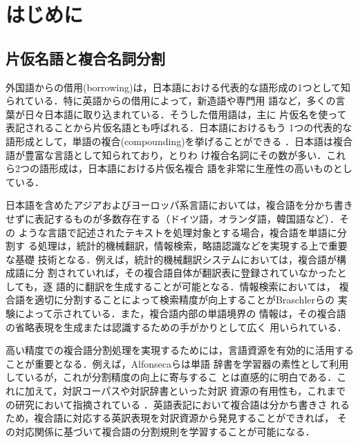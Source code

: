 \documentclass[japanese]{jnlp_1.4}
\begin{document}
\maketitle


\section{はじめに}

\subsection{片仮名語と複合名詞分割}

外国語からの借用(borrowing)は，日本語における代表的な語形成の1つとして知
られている\cite{Tsujimura06}．特に英語からの借用によって，新造語や専門用
語など，多くの言葉が日々日本語に取り込まれている．そうした借用語は，主に
片仮名を使って表記されることから片仮名語とも呼ばれる．日本語におけるもう
1つの代表的な語形成として，単語の複合(compounding)を挙げることができる
\cite{Tsujimura06}．日本語は複合語が豊富な言語として知られており，とりわ
け複合名詞にその数が多い．これら2つの語形成は，日本語における片仮名複合
語を非常に生産性の高いものとしている．

日本語を含めたアジアおよびヨーロッパ系言語においては，複合語を分かち書き
せずに表記するものが多数存在する（ドイツ語，オランダ語，韓国語など）．その
ような言語で記述されたテキストを処理対象とする場合，複合語を単語に分割す
る処理は，統計的機械翻訳，情報検索，略語認識などを実現する上で重要な基礎
技術となる．例えば，統計的機械翻訳システムにおいては，複合語が構成語に分
割されていれば，その複合語自体が翻訳表に登録されていなかったとしても，逐
語的に翻訳を生成することが可能となる\cite{Koehn03}．情報検索においては，
複合語を適切に分割することによって検索精度が向上することがBraschlerらの
実験によって示されている\cite{Braschler04}．また，複合語内部の単語境界の
情報は，その複合語の省略表現を生成または認識するための手がかりとして広く
用いられている\cite{Schwartz03,Okazaki08}．

高い精度での複合語分割処理を実現するためには，言語資源を有効的に活用する
ことが重要となる．例えば，Alfonsecaら\citeyear{AlfonsecaCICLing08}は単語
辞書を学習器の素性として利用しているが，これが分割精度の向上に寄与するこ
とは直感的に明白である．これに加えて，対訳コーパスや対訳辞書といった対訳
資源の有用性も，これまでの研究において指摘されている
\cite{Brown02,Koehn03,Nakazawa05}．英語表記において複合語は分かち書きさ
れるため，複合語に対応する英訳表現を対訳資源から発見することができれば，
その対応関係に基づいて複合語の分割規則を学習することが可能になる．
\end{document}
